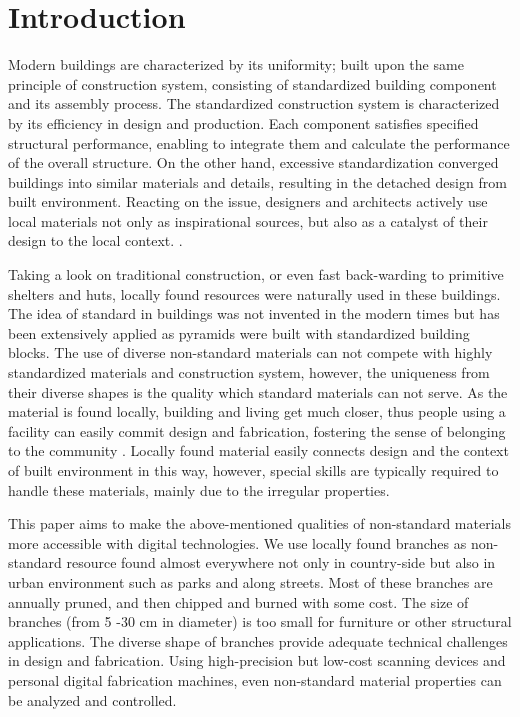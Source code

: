 \section{Introduction}
Modern buildings are characterized by its uniformity; built upon the same principle of construction system, consisting of standardized building component and its assembly process.
The standardized construction system is characterized by its efficiency in design and production.
Each component satisfies specified structural performance, enabling to integrate them and calculate the performance of the overall structure.
On the other hand, excessive standardization converged buildings into similar materials and details, resulting in the detached design from built environment.
Reacting on the issue, designers and architects actively use local materials not only as inspirational sources, but also as a catalyst of their design to the local context. \cite{oliver1997encyclopedia}.


Taking a look on traditional construction, or even fast back-warding to primitive shelters and huts, locally found resources were naturally used in these buildings.
The idea of standard in buildings was not invented in the modern times but has been extensively applied as pyramids were built with standardized building blocks.
The use of diverse non-standard materials can not compete with highly standardized materials and construction system, however, the uniqueness from their diverse shapes is the quality which standard materials can not serve.
As the material is found locally, building and living get much closer, thus people using a facility can easily commit design and fabrication, fostering the sense of belonging to the community \cite{}. 
Locally found material easily connects design and the context of built environment in this way, however, special skills are typically required to handle these materials, mainly due to the irregular properties.

This paper aims to make the above-mentioned qualities of non-standard materials more accessible with digital technologies.
We use locally found branches as non-standard resource found almost everywhere not only in country-side but also in urban environment such as parks and along streets.
Most of these branches are annually pruned, and then chipped and burned with some cost.
The size of branches (from 5 -30 cm in diameter) is too small for furniture or other structural applications.
The diverse shape of branches provide adequate technical challenges in design and fabrication.
Using high-precision but low-cost scanning devices and personal digital fabrication machines, even non-standard material properties can be analyzed and controlled.

